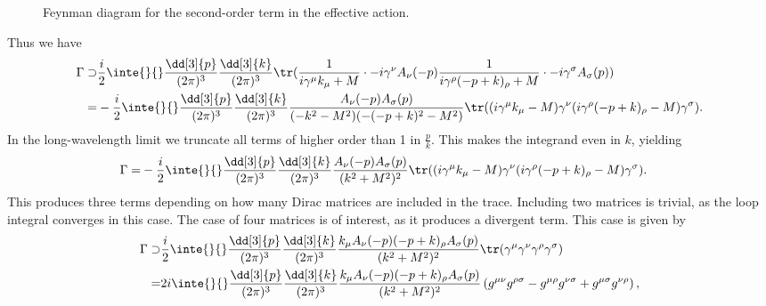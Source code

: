 \begin{figure}[!ht]
	\centering
	\caption{Feynman diagram for the second-order term in the effective action.}
	\label{fig:qhe_fd}
\end{figure}

Thus we have
\begin{align*}
	\Gamma \supset& \frac{i}{2}\inte{}{}\frac{\dd[3]{p}}{(2\pi)^{3}}\frac{\dd[3]{k}}{(2\pi)^{3}}\tr(\frac{1}{i\gamma^{\mu}k_{\mu} + M}\cdot -i\gamma^{\nu}A_{\nu}(-p)\frac{1}{i\gamma^{\rho}(-p + k)_{\rho} + M}\cdot -i\gamma^{\sigma}A_{\sigma}(p)) \\
	             =& -\frac{i}{2}\inte{}{}\frac{\dd[3]{p}}{(2\pi)^{3}}\frac{\dd[3]{k}}{(2\pi)^{3}}\frac{A_{\nu}(-p)A_{\sigma}(p)}{(-k^{2} - M^{2})(-(-p + k)^{2} - M^{2})}\tr((i\gamma^{\mu}k_{\mu} - M)\gamma^{\nu}(i\gamma^{\rho}(-p + k)_{\rho} - M)\gamma^{\sigma}).
\end{align*}
In the long-wavelength limit we truncate all terms of higher order than 1 in $\frac{p}{k}$. This makes the integrand even in $k$, yielding
\begin{align*}
	\Gamma =& -\frac{i}{2}\inte{}{}\frac{\dd[3]{p}}{(2\pi)^{3}}\frac{\dd[3]{k}}{(2\pi)^{3}}\frac{A_{\nu}(-p)A_{\sigma}(p)}{(k^{2} + M^{2})^{2}}\tr((i\gamma^{\mu}k_{\mu} - M)\gamma^{\nu}(i\gamma^{\rho}(-p + k)_{\rho} - M)\gamma^{\sigma}).
\end{align*}
This produces three terms depending on how many Dirac matrices are included in the trace. Including two matrices is trivial, as the loop integral converges in this case. The case of four matrices is of interest, as it produces a divergent term. This case is given by
\begin{align*}
	\Gamma \supset& \frac{i}{2}\inte{}{}\frac{\dd[3]{p}}{(2\pi)^{3}}\frac{\dd[3]{k}}{(2\pi)^{3}}\frac{k_{\mu}A_{\nu}(-p)(-p + k)_{\rho}A_{\sigma}(p)}{(k^{2} + M^{2})^{2}}\tr(\gamma^{\mu}\gamma^{\nu}\gamma^{\rho}\gamma^{\sigma}) \\
	             =& 2i\inte{}{}\frac{\dd[3]{p}}{(2\pi)^{3}}\frac{\dd[3]{k}}{(2\pi)^{3}}\frac{k_{\mu}A_{\nu}(-p)(-p + k)_{\rho}A_{\sigma}(p)}{(k^{2} + M^{2})^{2}}\left(g^{\mu\nu}g^{\rho\sigma} - g^{\mu\rho}g^{\nu\sigma} + g^{\mu\sigma}g^{\nu\rho}\right),
\end{align*}

